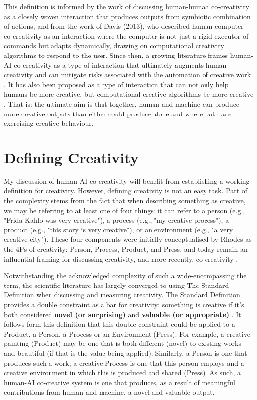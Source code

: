 This definition is informed by the work of \cite{Candy2002-ra} discussing human-human co-creativity as a closely woven interaction that produces outputs from symbiotic combination of actions, and from the work of Davis (2013), \cite{Davis2013-jy} who described human-computer co-creativity as an interaction where the computer is not just a rigid executor of commands but adapts dynamically, drawing on computational creativity algorithms to respond to the user. Since then, a growing literature frames human-AI co-creativity as a type of interaction that ultimately augments human creativity and can mitigate risks associated with the automation of creative work \cite{Yannakakis2014-zs, Kantosalo2020-zf, Rezwana2022-gg, Moruzzi2024-cq, Haase2024-yp, Lin2023-zq, Karimi2018-wi}. It has also been proposed as a type of interaction that can not only help humans be more creative, but computational creative algorithms be more creative \cite{Liapis2016-zt}. That is: the ultimate aim is that together, human and machine can produce more creative outputs than either could produce alone and where both are exercising creative behaviour. 

\section{Defining Creativity}

My discussion of human-AI co-creativity will benefit from establishing a working definition for creativity. However, defining creativity is not an easy task. Part of the complexity stems from the fact that when describing something as creative, we may be referring to at least one of four things: it can refer to a person (e.g., "Frida Kahlo was very creative"), a process (e.g., "my creative process"), a product (e.g., "this story is very creative"), or an environment (e.g., "a very creative city"). These four components were initially conceptualised by Rhodes \cite{Rhodes1961-od} as the 4Ps of creativity: Person, Process, Product, and Press, and today remain an influential framing for discussing creativity, and more recently, co-creativity \cite{Kantosalo2019-pz}. 

Notwithstanding the acknowledged complexity of such a wide-encompassing the term, the scientific literature has largely converged to using The Standard Definition when discussing and measuring creativity. The Standard Definition provides a double constraint as a bar for creativity: something is creative if it's both considered \textbf{novel (or surprising)} and \textbf{valuable (or appropriate)} \cite{Amabile1983-lj, Sternberg1998-oz, Runco2012-mk, Boden2003-hk}. It follows form this definition that this double constraint could be applied to a Product, a Person, a Process or an Environment (Press). For example, a creative painting (Product) may be one that is both different (novel) to existing works and beautiful (if that is the value being applied). Similarly, a Person is one that produces such a work, a creative Process is one that this person employs and a creative environment in which this is produced and shared (Press). As such, a human-AI co-creative system is one that produces, as a result of meaningful contributions from human and machine, a novel and valuable output. 

